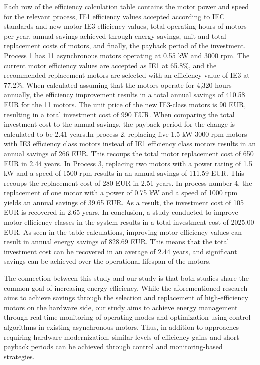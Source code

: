 Each row of the efficiency calculation table contains the motor power and speed for the relevant process, IE1 efficiency values accepted according to IEC standards and new motor IE3 efficiency values, total operating hours of motors per year, annual savings achieved through energy savings, unit and total replacement costs of motors, and finally, the payback period of the investment. Process 1 has 11 asynchronous motors operating at 0.55 kW and 3000 rpm. The current motor efficiency values are accepted as IE1 at 65.8\%, and the recommended replacement motors are selected with an efficiency value of IE3 at 77.2\%. When calculated assuming that the motors operate for 4,320 hours annually, the efficiency improvement results in a total annual savings of 410.58 EUR for the 11 motors. The unit price of the new IE3-class motors is 90 EUR, resulting in a total investment cost of 990 EUR. When comparing the total investment cost to the annual savings, the payback period for the change is calculated to be 2.41 years.In process 2, replacing five 1.5 kW 3000 rpm motors with IE3 efficiency class motors instead of IE1 efficiency class motors results in an annual savings of 266 EUR. This recoups the total motor replacement cost of 650 EUR in 2.44 years. In Process 3, replacing two motors with a power rating of 1.5 kW and a speed of 1500 rpm results in an annual savings of 111.59 EUR. This recoups the replacement cost of 280 EUR in 2.51 years. In process number 4, the replacement of one motor with a power of 0.75 kW and a speed of 1000 rpm yields an annual savings of 39.65 EUR. As a result, the investment cost of 105 EUR is recovered in 2.65 years. In conclusion, a study conducted to improve motor efficiency classes in the system results in a total investment cost of 2025.00 EUR. As seen in the table calculations, improving motor efficiency values can result in annual energy savings of 828.69 EUR. This means that the total investment cost can be recovered in an average of 2.44 years, and significant savings can be achieved over the operational lifespan of the motors.

The connection between this study and our study is that both studies share the common goal of increasing energy efficiency. While the aforementioned research aims to achieve savings through the selection and replacement of high-efficiency motors on the hardware side, our study aims to achieve energy management through real-time monitoring of operating modes and optimization using control algorithms in existing asynchronous motors. Thus, in addition to approaches requiring hardware modernization, similar levels of efficiency gains and short payback periods can be achieved through control and monitoring-based strategies.

